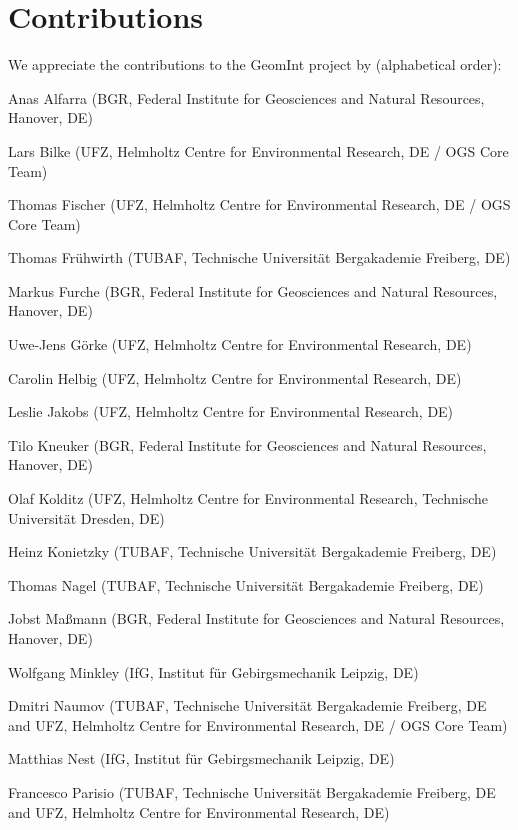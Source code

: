 \chapter*{Contributions}

We appreciate the contributions to the GeomInt project by  (alphabetical order):

\begin{list}{-}{\leftmargin=1em \itemindent=0em \itemsep=0.1em}
\item Anas Alfarra (BGR, Federal Institute for Geosciences and Natural Resources, Hanover, DE)	
\item Lars Bilke (UFZ, Helmholtz Centre for Environmental Research, DE / OGS Core Team)	
\item Thomas Fischer (UFZ, Helmholtz Centre for Environmental Research, DE / OGS Core Team)	
\item Thomas Fr\"uhwirth (TUBAF, Technische Universit\"at Bergakademie Freiberg, DE)	
\item Markus Furche (BGR, Federal Institute for Geosciences and Natural Resources, Hanover, DE)
\item Uwe-Jens G\"orke (UFZ, Helmholtz Centre for Environmental Research, DE)	
\item Carolin Helbig (UFZ, Helmholtz Centre for Environmental Research, DE)	
\item Leslie Jakobs (UFZ, Helmholtz Centre for Environmental Research, DE)
\item Tilo Kneuker (BGR, Federal Institute for Geosciences and Natural Resources, Hanover, DE)
\item Olaf Kolditz (UFZ, Helmholtz Centre for Environmental Research, Technische Universit\"at Dresden, DE) 
\item Heinz Konietzky (TUBAF, Technische Universit\"at Bergakademie Freiberg, DE)	
\item Thomas Nagel (TUBAF, Technische Universit\"at Bergakademie Freiberg, DE) 
\item Jobst Ma{\ss}mann (BGR, Federal Institute for Geosciences and Natural Resources, Hanover, DE)
\item Wolfgang Minkley (IfG, Institut für Gebirgsmechanik Leipzig, DE)	
\item Dmitri Naumov (TUBAF, Technische Universit\"at Bergakademie Freiberg, DE and UFZ, Helmholtz Centre for Environmental Research, DE / OGS Core Team)	
\item Matthias Nest (IfG, Institut für Gebirgsmechanik Leipzig, DE)	
\item Francesco Parisio (TUBAF, Technische Universit\"at Bergakademie Freiberg, DE and UFZ, Helmholtz Centre for Environmental Research, DE)	

\end{list}
